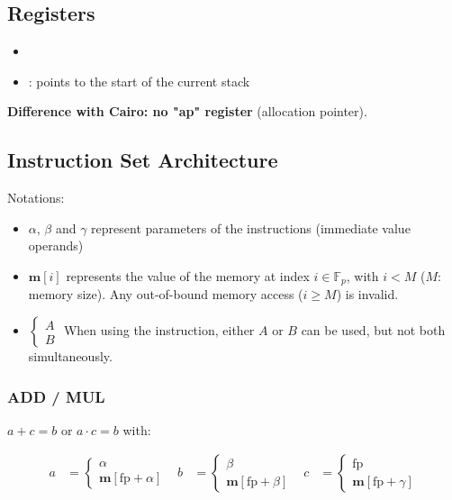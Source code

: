 \documentclass{article}
\theoremstyle{definition}
\newcommand{\Fp}{\mathbb F_p}
\begin{document}

\subsection{Registers}

\begin{itemize}
    \item {}
    \item {} : points to the start of the current stack
\end{itemize}


\textbf{Difference with Cairo: no "ap" register} (allocation pointer).


\subsection{Instruction Set Architecture}

Notations:
\begin{itemize}
    \item $\alpha$, $\beta$ and $\gamma$ represent parameters of the instructions (immediate value operands)
    \item $\textbf{m}[i]$ represents the value of the memory at index $i \in \Fp$, with $i < M$ ($M$: memory size). Any out-of-bound memory access ($i \geq M$) is invalid.
    \item $\begin{cases} A \\ B \end{cases}$ When using the instruction, either $A$ or $B$ can be used, but not both simultaneously.
\end{itemize}


\subsubsection{ADD / MUL}

$a + c = b$ or $a \cdot c = b$ with: 

\begin{align*}
a &= 
\begin{cases}
\alpha \\
\textbf{m}[\text{fp} + \alpha]
\end{cases}
&
b &= 
\begin{cases}
\beta \\
\textbf{m}[\text{fp} + \beta]
\end{cases}
&
c &= 
\begin{cases}
\text{fp} \\
\textbf{m}[\text{fp} + \gamma]
\end{cases}
\end{align*}
\end{document}
